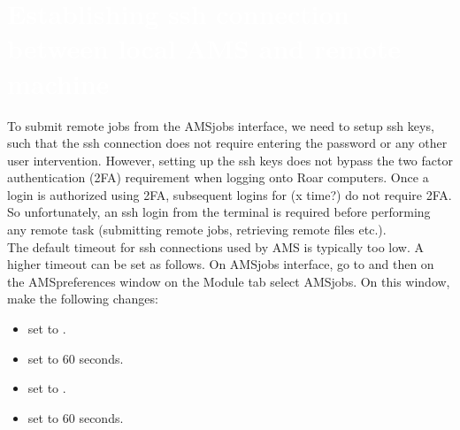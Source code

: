 \section{\textcolor{white}
    {Establishing ssh connection between local AMS and remote machine} \label{sec2:ssh_ams_roar}
}
To submit remote jobs from the AMSjobs interface, we need to setup ssh keys, such that the ssh connection does not require entering the password or any other user intervention. 
However, setting up the ssh keys does not bypass the two factor authentication (2FA) requirement when logging onto Roar computers. 
Once a login is authorized using 2FA, subsequent logins for (x time?) do not require 2FA. 
So unfortunately, an ssh login from the terminal is required before performing any remote task (submitting remote jobs, retrieving remote files etc.). \\

The default timeout for ssh connections used by AMS is typically too low. 
A higher timeout can be set as follows. 
On AMSjobs interface, go to  and then on the AMSpreferences window on the Module tab select AMSjobs. 
On this window, make the following changes:
\begin{itemize}
    \item {} set to .
    \item {} set to 60 seconds.
    \item {} set to .
    \item {} set to 60 seconds.
\end{itemize}

